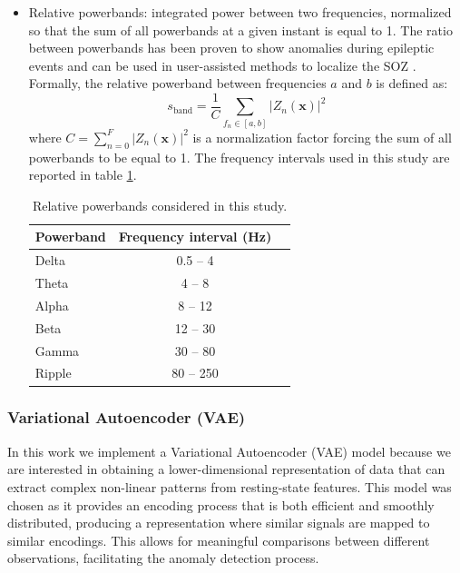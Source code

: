 \begin{itemize}
    \item Relative powerbands: integrated power between two frequencies, 
    normalized so that the sum of all powerbands at a given instant is equal to
    1.
    The ratio between powerbands has been proven to show anomalies during 
    epileptic events \cite{powerbands} and can be used in user-assisted methods
    to localize the SOZ \cite{bartolomei}.
    Formally, the relative powerband between frequencies $a$ and $b$ is
    defined as:
    \begin{equation}
    s_{\text{band}} = \frac{1}{C}
    \sum\limits_{f_n \in [a, b]} |Z_n(\mathbf{x})|^2
    \end{equation}
    where $C=\sum\limits_{n=0}^{F} |Z_n(\mathbf{x})|^2$ is a normalization factor
    forcing the sum of all powerbands to be equal to 1.
    The frequency intervals used in this study are reported in table
    \ref{tab:bands}.

\begin{table}[H]
\centering
\begin{tabular}{lcc}
\hline
\textbf{Powerband} & \textbf{Frequency interval (Hz)} \\
\hline
Delta   & 0.5 -- 4 \\
Theta   & 4 -- 8 \\
Alpha   & 8 -- 12 \\
Beta    & 12 -- 30 \\
Gamma   & 30 -- 80 \\
Ripple  & 80 -- 250 \\
\hline
\end{tabular}
\caption{Relative powerbands considered in this study.}
\label{tab:bands}
\end{table}


\end{itemize}


\subsubsection{Variational Autoencoder (VAE)} \label{meth:vae}

In this work we implement a Variational Autoencoder (VAE) model because we are
interested in obtaining a lower-dimensional representation of data that can 
extract complex non-linear patterns from resting-state features.
This model was chosen as it provides an encoding process that is both efficient
and smoothly distributed, producing a representation where similar signals are
mapped to similar encodings.
This allows for meaningful comparisons between different observations,
facilitating the anomaly detection process.

